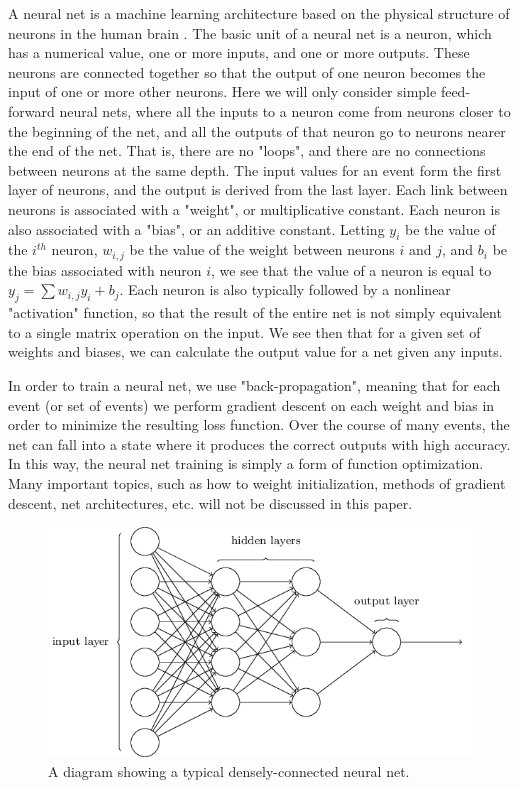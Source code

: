 \documentclass{article}
\begin{document}
A neural net is a machine learning architecture based on the physical structure of neurons in the human brain \cite{neural_net}. The basic unit of a neural net is a neuron, which has a numerical value, one or more inputs, and one or more outputs. These neurons are connected together so that the output of one neuron becomes the input of one or more other neurons. Here we will only consider simple feed-forward neural nets, where all the inputs to a neuron come from neurons closer to the beginning of the net, and all the outputs of that neuron go to neurons nearer the end of the net. That is, there are no "loops", and there are no connections between neurons at the same depth. The input values for an event form the first layer of neurons, and the output is derived from the last layer. Each link between neurons is associated with a "weight", or multiplicative constant. Each neuron is also associated with a "bias", or an additive constant. Letting $y_i$ be the value of the $i^{th}$ neuron, $w_{i,j}$ be the value of the weight between neurons $i$ and $j$, and $b_i$ be the bias associated with neuron $i$, we see that the value of a neuron is equal to $y_j = \sum{w_{i,j}y_i} + b_j$. Each neuron is also typically followed by a nonlinear "activation" function, so that the result of the entire net is not simply equivalent to a single matrix operation on the input. We see then that for a given set of weights and biases, we can calculate the output value for a net given any inputs.

In order to train a neural net, we use "back-propagation", meaning that for each event (or set of events) we perform gradient descent on each weight and bias in order to minimize the resulting loss function. Over the course of many events, the net can fall into a state where it produces the correct outputs with high accuracy. In this way, the neural net training is simply a form of function optimization. Many important topics, such as how to weight initialization, methods of gradient descent, net architectures, etc. will not be discussed in this paper.

\begin{figure}[t]
    \centering
    \includegraphics[width=0.5\linewidth]{images/neural_net.png}
    \caption{A diagram showing a typical densely-connected neural net.}
    \label{neural_net}
\end{figure}
\end{document}
